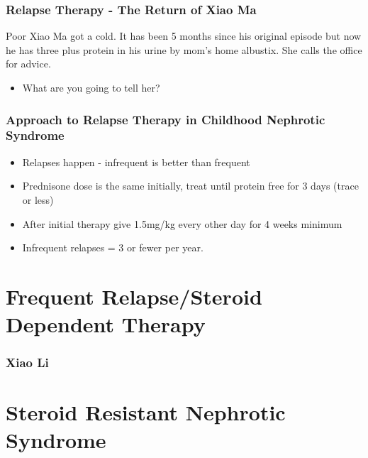 \begin{frame}\frametitle{Relapse Therapy - The Return of Xiao Ma}

Poor Xiao Ma got a cold. It has been 5 months since his original episode
but now he has three plus protein in his urine by mom's home albustix.
She calls the office for advice.

\begin{itemize}[<+->]
\itemsep1pt\parskip0pt
\item
  What are you going to tell her?
\end{itemize}

\end{frame}

\begin{frame}\frametitle{Approach to Relapse Therapy in Childhood
Nephrotic Syndrome}

\begin{itemize}[<+->]
\itemsep1pt\parskip0pt
\item
  Relapses happen - infrequent is better than frequent
\item
  Prednisone dose is the same initially, treat until protein free for 3
  days (trace or less)
\item
  After initial therapy give 1.5mg/kg every other day for 4 weeks
  minimum
\item
  Infrequent relapses = 3 or fewer per year.
\end{itemize}

\end{frame}

\section{Frequent Relapse/Steroid Dependent Therapy}

\begin{frame}\frametitle{Xiao Li}

\end{frame}

\section{Steroid Resistant Nephrotic Syndrome}
